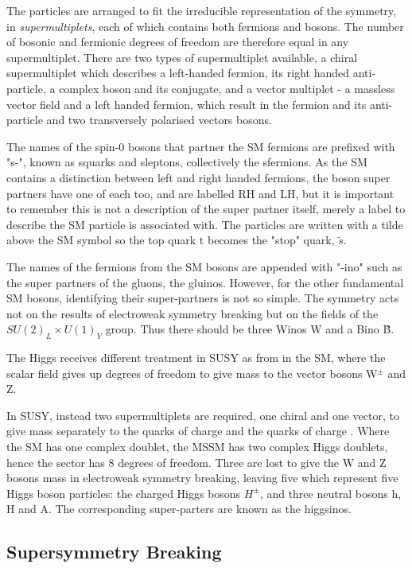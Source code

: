 The particles are arranged to fit the irreducible representation of the symmetry, in \textit{supermultiplets}, each of which contains both fermions and bosons. The number of bosonic and fermionic degrees of freedom are therefore equal in any supermultiplet. There are two types of supermultiplet available, a chiral supermultiplet which describes a left-handed fermion, its right handed anti-particle, a complex boson and its conjugate, and a vector multiplet - a massless vector field and a left handed fermion, which result in the fermion and its anti-particle and two transversely polarised vectors bosons\cite{SUSYPrime}. 

The names of the spin-0 bosons that partner the SM fermions are prefixed with "s-", known as squarks and sleptons, collectively the sfermions. As the SM contains a distinction between left and right handed fermions, the boson super partners have one of each too, and are labelled RH and LH, but it is important to remember this is not a description of the super partner itself, merely a label to describe the SM particle is associated with. The particles are written with a tilde above the SM symbol so the top quark t becomes the "stop" quark, $\tilde{s}$.

The names of the fermions from the SM bosons are appended with "-ino" such as the super partners of the gluons, the gluinos. However, for the other fundamental SM bosons, identifying their super-partners is not so simple. The symmetry acts not on the results of electroweak symmetry breaking but on the fields of the $SU(2)_{L} \times U(1)_{Y}$ group. Thus there should be three Winos {W} and a Bino \~{B}. 

The Higgs receives different treatment in SUSY as from in the SM, where the scalar field gives up degrees of freedom to give mass to the vector bosons W$^{\pm}$ and Z.

In SUSY, instead two supermultiplets are required, one chiral and one vector, to give mass separately to the quarks of charge  and the quarks of charge \cite{SUSYsuch}. Where the SM has one complex doublet, the MSSM has two complex Higgs doublets, hence the sector has 8 degrees of freedom. Three are lost to give the W and Z bosons mass in electroweak symmetry breaking, leaving five which represent five Higgs boson particles: the charged Higgs bosons $H^{\pm}$, and three neutral bosons h, H and A. The corresponding super-parters are known as the higgsinos.  


\subsection{Supersymmetry Breaking}

